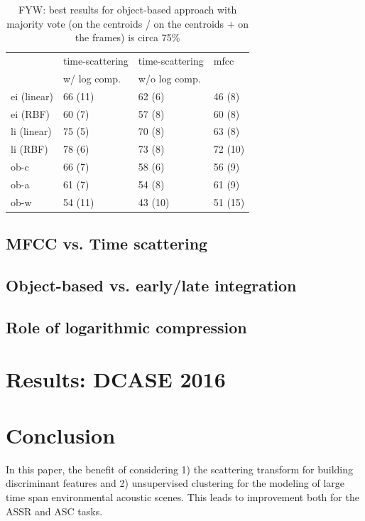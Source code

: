 \documentclass[journal]{IEEEtran}
\makeatletter
\newcommand*{\vs}{vs.\@\xspace}
\makeatother
\begin{document}
\begin{table}
\begin{center}
\begin{tabular}{llll}
                    & time-scattering & time-scattering & mfcc \\
                    & w/ log comp.    & w/o log comp.   &      \\
             \hline
ei (linear)  & 66 (11)        & 62 (6)  & 46 (8)    \\
ei (RBF)     & 60 (7)         & 57 (8)  & 60 (8)    \\
li (linear)  & 75 (5)         & 70 (8)  & 63 (8)   \\
li (RBF)     & 78 (6)         & 73 (8)  & 72 (10)   \\
ob-c         & 66 (7)         & 58 (6)  & 56 (9)   \\
ob-a         & 61 (7)         & 54 (8)  & 61 (9)   \\
ob-w         & 54 (11)        & 43 (10) & 51 (15)   \\
\end{tabular}
\caption{FYW: best results for object-based approach with majority vote (on the centroids / on the centroids + on the frames) is circa 75\%}
\end{center}
\end{table}

\subsection{MFCC \vs Time scattering}

\subsection{Object-based \vs early/late integration}

\subsection{Role of logarithmic compression}

\section{Results: DCASE 2016}

\section{Conclusion}

In this paper, the benefit of considering 1) the scattering transform for building discriminant features and 2) unsupervised clustering for the modeling of large time span environmental acoustic scenes.
This leads to improvement both for the ASSR and ASC tasks.
\end{document}
